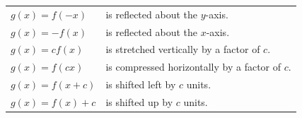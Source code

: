 \documentclass[10.5pt,twoside]{report}
\theoremstyle{definition}
\begin{document}
\begin{tabular}{l l} 
\hspace{4ex} $g(x)=f(-x)$ & is reflected about the $y$-axis.\\
\hspace{4ex} $g(x)=-f(x)$ & is reflected about the $x$-axis.\\
\hspace{4ex} $g(x)=cf(x)$ & is stretched vertically by a factor of $c$.\\
\hspace{4ex} $g(x)=f(cx)$ & is compressed horizontally by a factor of $c$.\\
\hspace{4ex} $g(x)=f(x+c)$ & is shifted left by $c$ units.\\
\hspace{4ex} $g(x)=f(x)+c$ & is shifted up by $c$ units.\\
\end{tabular}

${}$\\
\end{document}
